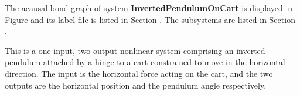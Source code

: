 

   The acausal bond graph of system \textbf{InvertedPendulumOnCart} is
   displayed in Figure  and its label
   file is listed in Section .
   The subsystems are listed in Section .

This is a one input, two output nonlinear system comprising an
inverted pendulum attached by a hinge to a cart constrained to move in
the horizontal direction. The input is the horizontal force acting on
the cart, and the two outputs are the horizontal position and the
pendulum angle respectively.
